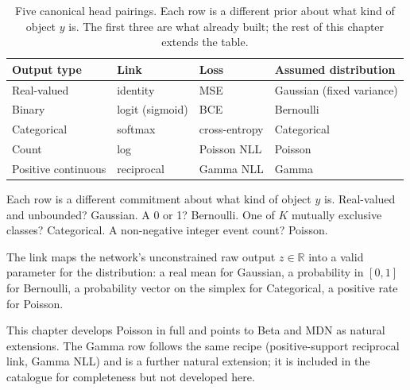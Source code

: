 \begin{table}[ht]
\centering
\begin{tabular}{llll}
\toprule
Output type         & Link              & Loss          & Assumed distribution      \\
\midrule
Real-valued         & identity          & MSE           & Gaussian (fixed variance) \\
Binary              & logit (sigmoid)   & BCE           & Bernoulli                 \\
Categorical         & softmax           & cross-entropy & Categorical               \\
Count               & log               & Poisson NLL   & Poisson                   \\
Positive continuous & reciprocal        & Gamma NLL     & Gamma                     \\
\bottomrule
\end{tabular}
\caption{Five canonical head pairings. Each row is a different prior about
  what kind of object $y$ is. The first three are what 
  already built; the rest of this chapter extends the table.}
\label{tab:head-catalogue}
\end{table}

Each row is a different commitment about what kind of object $y$ is.
Real-valued and unbounded? Gaussian. A 0 or 1? Bernoulli. One of $K$
mutually exclusive classes? Categorical. A non-negative integer event
count? Poisson.

The link maps the network's unconstrained raw output $z \in \mathbb{R}$
into a valid parameter for the distribution: a real mean for Gaussian, a
probability in $[0, 1]$ for Bernoulli, a probability vector on the simplex
for Categorical, a positive rate for Poisson.

This chapter develops Poisson in full and points to Beta and MDN as natural
extensions. The Gamma row follows the same recipe (positive-support
reciprocal link, Gamma NLL) and is a further natural extension; it is
included in the catalogue for completeness but not developed here.
